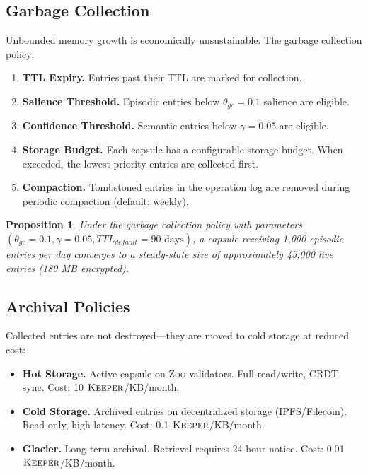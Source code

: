\documentclass[11pt,letterpaper]{article}
\newtheorem{proposition}[theorem]{Proposition}
\theoremstyle{definition}
\theoremstyle{remark}
\newcommand{\Zoo}{\textsc{Zoo}}
\newcommand{\KEEPER}{\textsc{Keeper}}
\begin{document}
\subsection{Garbage Collection}

Unbounded memory growth is economically unsustainable. The garbage collection policy:

\begin{enumerate}
    \item \textbf{TTL Expiry.} Entries past their TTL are marked for collection.
    \item \textbf{Salience Threshold.} Episodic entries below $\theta_{\textit{gc}} = 0.1$ salience are eligible.
    \item \textbf{Confidence Threshold.} Semantic entries below $\gamma = 0.05$ are eligible.
    \item \textbf{Storage Budget.} Each capsule has a configurable storage budget. When exceeded, the lowest-priority entries are collected first.
    \item \textbf{Compaction.} Tombstoned entries in the operation log are removed during periodic compaction (default: weekly).
\end{enumerate}

\begin{proposition}
Under the garbage collection policy with parameters $(\theta_{\textit{gc}} = 0.1, \gamma = 0.05, \textit{TTL}_{\textit{default}} = 90\text{ days})$, a capsule receiving 1,000 episodic entries per day converges to a steady-state size of approximately 45,000 live entries (180 MB encrypted).
\end{proposition}

\subsection{Archival Policies}

Collected entries are not destroyed---they are moved to cold storage at reduced cost:

\begin{itemize}
    \item \textbf{Hot Storage.} Active capsule on \Zoo{} validators. Full read/write, CRDT sync. Cost: 10 $\KEEPER$/KB/month.
    \item \textbf{Cold Storage.} Archived entries on decentralized storage (IPFS/Filecoin). Read-only, high latency. Cost: 0.1 $\KEEPER$/KB/month.
    \item \textbf{Glacier.} Long-term archival. Retrieval requires 24-hour notice. Cost: 0.01 $\KEEPER$/KB/month.
\end{itemize}
\end{document}
